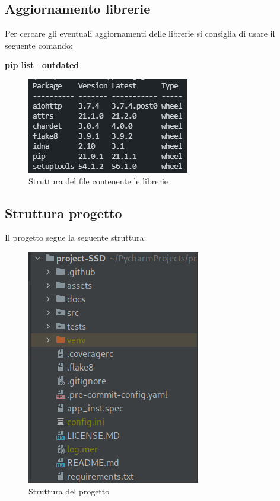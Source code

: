 \subsection{Aggiornamento librerie}
Per cercare gli eventuali aggiornamenti delle librerie si consiglia di usare il seguente comando:
\newline{}\centerline{\textbf{pip list --outdated}}\newline{}
\begin{figure}[H]
    \centering
    \includegraphics[scale = 0.7]{components/img/requirements_updates.png}
    \caption{Struttura del file contenente le librerie}
    \label{fig:Lista di aggiornamenti disponibili per le librerie}
\end{figure}

\subsection{Struttura progetto}
Il progetto segue la seguente struttura:
\begin{figure}[H]
    \centering
    \includegraphics[scale = 0.5]{components/img/struttura-cartella-ssd.png}
    \caption{Struttura del progetto}
    \label{fig:Struttura del progetto}
\end{figure}
